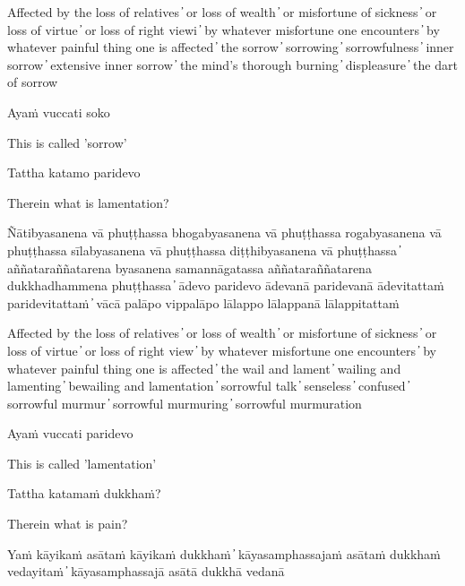 \begin{cprenglish}
  Affected by the loss of relatives  ̓  or loss of wealth  ̓  or misfortune of sickness  ̓  or loss of virtue  ̓  or loss of right viewi  ̓  by whatever misfortune one encounters  ̓  by whatever painful thing one is affected  ̓  the sorrow  ̓  sorrowing  ̓  sorrowfulness  ̓  inner sorrow  ̓  extensive inner sorrow  ̓  the mind’s thorough burning  ̓  displeasure  ̓  the dart of sorrow
\end{cprenglish}

Ayaṁ vuccati soko

\begin{cprenglish}
  This is called 'sorrow'
\end{cprenglish}

Tattha katamo paridevo

\begin{cprenglish}
  Therein what is lamentation?
\end{cprenglish}

Ñātibyasanena vā phuṭṭhassa bhogabyasanena vā phuṭṭhassa rogabyasanena vā phuṭṭhassa sīlabyasanena vā phuṭṭhassa diṭṭhibyasanena vā phuṭṭhassa  ̓  aññataraññatarena byasanena samannāgatassa aññataraññatarena dukkhadhammena phuṭṭhassa  ̓  ādevo paridevo ādevanā paridevanā ādevitattaṁ paridevitattaṁ  ̓  vācā palāpo vippalāpo lālappo lālappanā lālappitattaṁ

\begin{cprenglish}
  Affected by the loss of relatives  ̓  or loss of wealth  ̓  or misfortune of sickness  ̓  or loss of virtue  ̓  or loss of right view  ̓  by whatever misfortune one encounters  ̓  by whatever painful thing one is affected  ̓  the wail and lament  ̓  wailing and lamenting  ̓  bewailing and lamentation  ̓  sorrowful talk  ̓  senseless  ̓  confused  ̓  sorrowful murmur  ̓  sorrowful murmuring  ̓  sorrowful murmuration
\end{cprenglish}

Ayaṁ vuccati paridevo

\begin{cprenglish}
  This is called 'lamentation'
\end{cprenglish}

Tattha katamaṁ dukkhaṁ?

\begin{cprenglish}
  Therein what is pain?
\end{cprenglish}

Yaṁ kāyikaṁ asātaṁ kāyikaṁ dukkhaṁ  ̓  kāyasamphassajaṁ asātaṁ dukkhaṁ vedayitaṁ  ̓  kāyasamphassajā asātā dukkhā vedanā


